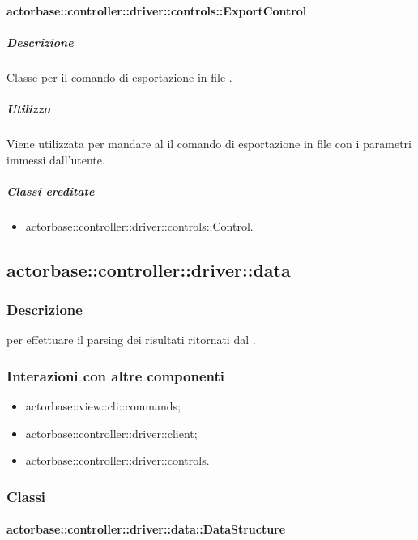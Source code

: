 \documentclass{scalatekids-article}
\begin{document}
\paragraph{actorbase::controller::driver::controls::ExportControl}

\subparagraph{Descrizione}

Classe per il comando di esportazione in file .

\subparagraph{Utilizzo}

Viene utilizzata per mandare al  il comando di esportazione in file  con i parametri immessi dall'utente.

\subparagraph{Classi ereditate}

\begin{itemize}
\item actorbase::controller::driver::controls::Control.
\end{itemize}

\subsection{actorbase::controller::driver::data}

\subsubsection{Descrizione}

 per effettuare il parsing dei risultati ritornati dal .

\subsubsection{Interazioni con altre componenti}
\begin{itemize}
\item actorbase::view::cli::commands;
\item actorbase::controller::driver::client;
\item actorbase::controller::driver::controls.
\end{itemize}

\subsubsection{Classi}

\paragraph{actorbase::controller::driver::data::DataStructure}
\end{document}

